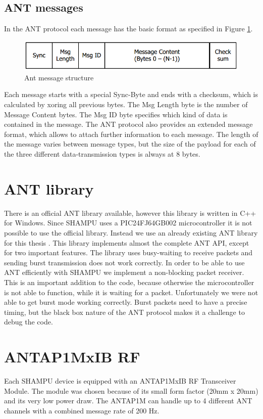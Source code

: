 \subsection{ANT messages}
In the ANT protocol each message has the basic format as specified in Figure \ref{fig:antmsg}.
\begin{figure}[H]
	\centering
	\includegraphics[scale=.75]{content/images/ANTmsg.png}
	\caption{Ant message structure\cite{DynastreamInnovationsInc.2013}}\label{fig:antmsg}
\end{figure}
Each message starts with a special Sync-Byte and ends with a checksum, which is calculated by xoring all previous bytes. The Msg Length byte is the number of Message Content bytes. The Msg ID byte specifies which kind of data is contained in the message. The ANT protocol also provides an extended message format, which allows to attach further information to each message. The length of the message varies between message types, but the size of the payload for each of the three different data-transmission types is always at 8 bytes.

\section{ANT library}
There is an official ANT library \cite{ANTWinLib} available, however this library is written in C++ for Windows. Since SHAMPU uses a PIC24FJ64GB002 microcontroller\cite{Smeets:2014:DAL:2602339.2602401} it is not possible to use the official library. Instead we use an already existing ANT library for this thesis \cite{ANTPICLIB}. This library implements almost the complete ANT API, except for two important features. The library uses busy-waiting to receive packets and sending burst transmission does not work correctly. In order to be able to use ANT efficiently with SHAMPU we implement a non-blocking packet receiver. This is an important addition to the code, because otherwise the microcontroller is not able to function, while it is waiting for a packet. Unfortunately we were not able to get burst mode working correctly. Burst packets need to have a precise timing, but the black box nature of the ANT protocol makes it a challenge to debug the code.

\section{ANTAP1MxIB RF}
Each SHAMPU device is equipped with an ANTAP1MxIB RF Transceiver Module. The module was chosen because of its small form factor (20mm x 20mm) and its very low power draw. The ANTAP1M can handle up to 4 different ANT channels with a combined message rate of 200 Hz. 

